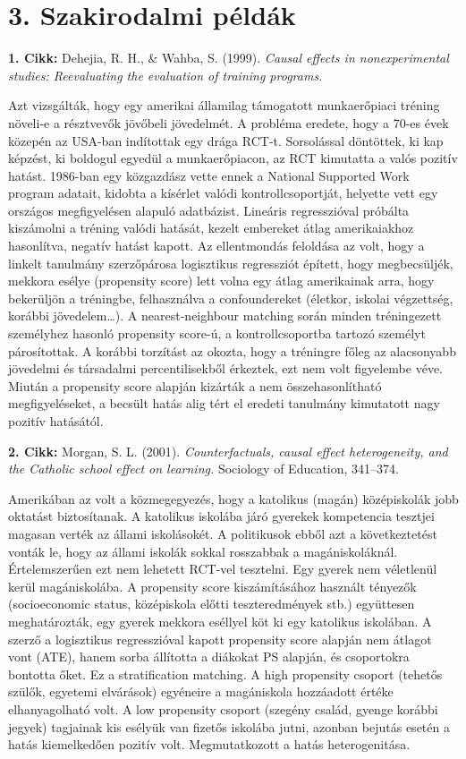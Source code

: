 \documentclass[11pt,a4paper]{article}
\begin{document}
\section*{3. Szakirodalmi példák}

\textbf{1. Cikk:} Dehejia, R. H., \& Wahba, S. (1999). \emph{Causal effects in nonexperimental studies:
Reevaluating the evaluation of training programs.}

Azt vizsgálták, hogy egy amerikai államilag támogatott munkaerőpiaci tréning növeli-e a résztvevők
jövőbeli jövedelmét. A probléma eredete, hogy a 70-es évek közepén az USA-ban indítottak egy
drága RCT-t. Sorsolással döntöttek, ki kap képzést, ki boldogul egyedül a munkaerőpiacon,
az RCT kimutatta a valós pozitív hatást. 1986-ban egy közgazdász vette ennek a National
Supported Work program adatait, kidobta a kísérlet valódi kontrollcsoportját, helyette vett egy
országos megfigyelésen alapuló adatbázist. Lineáris regresszióval próbálta kiszámolni a tréning
valódi hatását, kezelt embereket átlag amerikaiakhoz hasonlítva, negatív hatást kapott. Az
ellentmondás feloldása az volt, hogy a linkelt tanulmány szerzőpárosa logisztikus regressziót
épített, hogy megbecsüljék, mekkora esélye (propensity score) lett volna egy átlag amerikainak
arra, hogy bekerüljön a tréningbe, felhasználva a confoundereket (életkor, iskolai végzettség,
korábbi jövedelem\dots). A nearest-neighbour matching során minden tréningezett személyhez hasonló propensity score-ú, a kontrollcsoportba tartozó személyt párosítottak. A korábbi torzítást az okozta, hogy a tréningre főleg az alacsonyabb jövedelmi és társadalmi percentilisekből érkeztek, ezt nem volt figyelembe véve. Miután a propensity score alapján kizárták a nem összehasonlítható megfigyeléseket, a becsült hatás alig tért el eredeti tanulmány kimutatott nagy pozitív hatásától.

\textbf{2. Cikk:} Morgan, S. L. (2001). \emph{Counterfactuals, causal effect heterogeneity, and the Catholic
school effect on learning.} Sociology of Education, 341--374.

Amerikában az volt a közmegegyezés, hogy a katolikus (magán) középiskolák jobb oktatást
biztosítanak. A katolikus iskolába járó gyerekek kompetencia tesztjei magasan verték az állami
iskolásokét. A politikusok ebből azt a következtetést vonták le, hogy az állami iskolák sokkal
rosszabbak a magániskoláknál. Értelemszerűen ezt nem lehetett RCT-vel tesztelni. Egy gyerek
nem véletlenül kerül magániskolába. A propensity score kiszámításához használt tényezők
(socioeconomic status, középiskola előtti teszteredmények stb.) együttesen meghatározták, egy
gyerek mekkora eséllyel köt ki egy katolikus iskolában. A szerző a logisztikus regresszióval kapott
propensity score alapján nem átlagot vont (ATE), hanem sorba állította a diákokat PS alapján,
és csoportokra bontotta őket. Ez a stratification matching. A high propensity csoport (tehetős
szülők, egyetemi elvárások) egyéneire a magániskola hozzáadott értéke elhanyagolható volt. A
low propensity csoport (szegény család, gyenge korábbi jegyek) tagjainak kis esélyük van fizetős
iskolába jutni, azonban bejutás esetén a hatás kiemelkedően pozitív volt. Megmutatkozott a hatás
heterogenitása.
\end{document}
